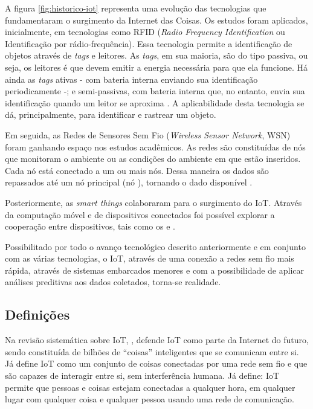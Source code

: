 
A figura \ref{fig:historico-iot} representa uma evolução das tecnologias que
fundamentaram o surgimento da Internet das Coisas. Os estudos foram aplicados,
inicialmente, em tecnologias como RFID (\textit{Radio Frequency Identification}
ou Identificação por rádio-frequência).  Essa tecnologia permite a
identificação de objetos através de \textit{tags} e leitores. As \textit{tags},
em sua maioria, são do tipo passiva, ou seja, os leitores é que devem emitir a
energia necessária para que ela funcione. Há ainda as \textit{tags} ativas -
com bateria interna enviando sua identificação periodicamente -; e
semi-passivas, com bateria interna que, no entanto, envia sua identificação
quando um leitor se aproxima \cite{want2006introduction}. A aplicabilidade
desta tecnologia se dá, principalmente, para identificar e rastrear um objeto.

Em seguida, as Redes de Sensores Sem Fio (\textit{Wireless Sensor Network}, WSN)
foram ganhando espaço nos estudos acadêmicos. As redes são constituídas de nós
que monitoram o ambiente ou as condições do ambiente em que estão inseridos.
Cada nó está conectado a um ou mais nós. Dessa maneira os dados são repassados
até um nó principal (nó \gateway), tornando o dado disponível
\cite{lewis2004wireless}.

Posteriormente, as \textit{smart things} colaboraram para o surgimento do IoT.
Através da computação móvel e de dispositivos conectados foi possível explorar
a cooperação entre dispositivos, tais como os \smartphones[] e \smartwatches.

Possibilitado por todo o avanço tecnológico descrito anteriormente e em
conjunto com as várias tecnologias, o IoT, através de uma conexão a redes sem
fio mais rápida, através de sistemas embarcados menores e com a possibilidade
de aplicar análises preditivas aos dados coletados, torna-se realidade.

\subsection{Definições} \label{subsec:iot-definicoes}

Na revisão sistemática sobre IoT, , defende IoT como
parte da Internet do futuro, sendo constituída de bilhões de ``coisas''
inteligentes que se comunicam entre si. Já  define
IoT como um conjunto de coisas conectadas por uma rede sem fio e que são
capazes de interagir entre si, sem interferência humana. Já
 define: IoT permite que pessoas e coisas
estejam conectadas a qualquer hora, em qualquer lugar com qualquer coisa e
qualquer pessoa usando uma rede de comunicação.


